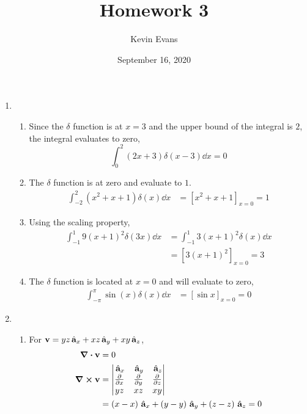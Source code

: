 \documentclass{homework}
\title{Homework 3}
\author{Kevin Evans}
\date{September 16, 2020}
\begin{document}
	\maketitle
	\begin{enumerate}
		\item \begin{enumerate}
			\item Since the $\delta$ function is at $x=3$ and the upper bound of the integral is $2$, the integral evaluates to zero,
			\[ \int_0^2 \left(2x + 3\right) \delta(x - 3) \dd{x} = 0\]
			
			\item The $\delta$ function is at zero and evaluate to $1$. \begin{align*}
				\int_{-2}^2 \left(x^2 + x + 1\right) \delta(x) \dd{x} & = \left[x^2 + x + 1\right]_{x=0} = 1
			\end{align*}
		
			\item Using the scaling property, \begin{align*}
				\int_{-1}^1 9 \left(x+1\right)^2 \delta(3x) \dd{x} & = \int_{-1}^1 3 \left(x + 1\right)^2 \delta(x) \dd{x} \\
					& = \left[3 \left(x + 1\right)^2\right]_{x=0} = 3
			\end{align*}
		
			\item The $\delta$ function is located at $x=0$ and will evaluate to zero, \begin{align*}
				\int_{-\pi}^{\pi} \sin(x) \delta(x) \dd{x} & = \left[ \sin x \right]_{x=0} = 0
			\end{align*}
		\end{enumerate}
	
		\pagebreak
		
		\item \begin{enumerate}
			\item For $\boldsymbol{\mathrm{v}} = yz \thinspace\hat{ \mathbf{a}}_{x} + xz \thinspace\hat{ \mathbf{a}}_{y} + xy \thinspace\hat{ \mathbf{a}}_{z}$, \begin{align*}
				\div{ \boldsymbol{\mathrm{v}} } & = 0 \qquad \text{} \\
				\curl{ \boldsymbol{\mathrm{v}} } & = \abs{\begin{matrix}
						\thinspace\hat{ \mathbf{a}}_{x} & \thinspace\hat{ \mathbf{a}}_{y} & \thinspace\hat{ \mathbf{a}}_{z} \\
						\pdv{x} & \pdv{y} & \pdv{z} \\
						yz & xz & xy
				\end{matrix}} \\
				& = \left(x - x\right) \thinspace\hat{ \mathbf{a}}_{x} + \left(y - y\right) \thinspace\hat{ \mathbf{a}}_{y} + \left(z - z\right) \thinspace\hat{ \mathbf{a}}_{z} = 0
			\end{align*}
		

\end{enumerate}
\end{enumerate}
\end{document}
